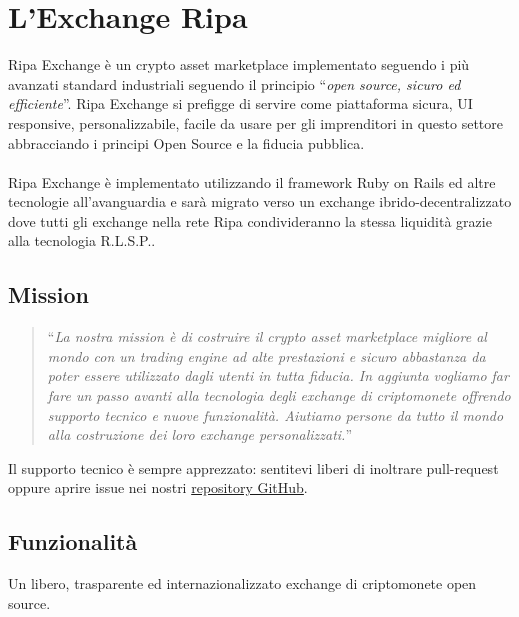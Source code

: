 \documentclass[11pt,fleqn]{book} %
\begin{document}
\chapter{L'Exchange Ripa}
Ripa Exchange è un crypto asset marketplace implementato seguendo i più avanzati standard industriali seguendo il principio
``\textit{open source, sicuro ed efficiente}''. Ripa Exchange si prefigge di servire come piattaforma sicura, UI responsive, 
personalizzabile, facile da usare per gli imprenditori in questo settore abbracciando i principi Open Source e la fiducia pubblica.\\\\
Ripa Exchange è implementato utilizzando il framework Ruby on Rails ed altre tecnologie all'avanguardia e sarà migrato verso
un exchange ibrido-decentralizzato dove tutti gli exchange nella rete Ripa condivideranno la stessa liquidità grazie alla tecnologia R.L.S.P..

\section{Mission}
\begin{quotation}
	``\textit{La nostra mission è di costruire il crypto asset marketplace migliore al mondo con un trading engine ad alte prestazioni 
	e sicuro abbastanza da poter essere utilizzato dagli utenti in tutta fiducia. In aggiunta vogliamo far fare un passo avanti 
	alla tecnologia degli exchange di criptomonete offrendo supporto tecnico e nuove funzionalità. Aiutiamo persone da tutto il mondo
	alla costruzione dei loro exchange personalizzati.}''
\end{quotation}

Il supporto tecnico è sempre apprezzato: sentitevi liberi di inoltrare pull-request oppure aprire issue nei nostri 
\href{https://github.com/RipaEx}{repository GitHub}.

\section{Funzionalità}
Un libero, trasparente ed internazionalizzato exchange di criptomonete open source.
\end{document}
